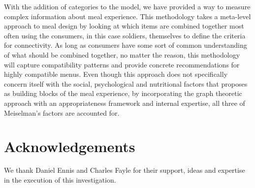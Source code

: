 With the addition of categories to the \citet{Ennisa} model, we have provided a way to measure complex information about meal experience.  This methodology takes a meta-level approach to meal design by looking at which items are combined together most often using the consumers, in this case soldiers, themselves to define the criteria for connectivity.  As long as consumers have some sort of common understanding of what should be combined together, no matter the reason, this methodology will capture compatibility patterns and provide concrete recommendations for highly compatible menus.  Even though this approach does not specifically concern itself with the social, psychological and nutritional factors that \citet{Meiselman2000} proposes as building blocks of the meal experience, by incorporating the graph theoretic approach with an appropriateness framework and internal expertise, all three of Meiselman’s factors are accounted for.  	

\section{Acknowledgements}
We thank Daniel Ennis and Charles Fayle for their support, ideas and expertise in the execution of this investigation.

\pagebreak
\renewcommand\bibname{{REFERENCES}} %
{} %

